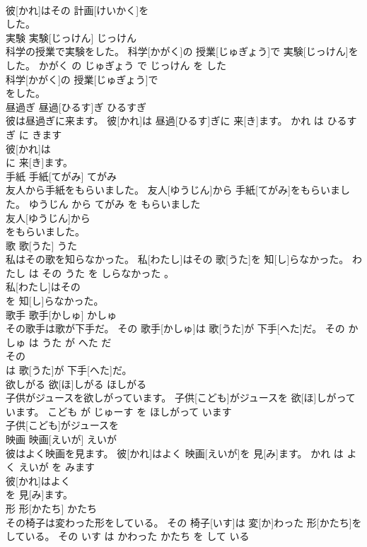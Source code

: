 \documentclass[8pt]{extreport}
\begin{document}
\begin{CJK}{UTF8}{min}
\\	彼[かれ]はその 計画[けいかく]を
\\	した。			
\\	実験	実験[じっけん]	じっけん	
\\	科学の授業で実験をした。	科学[かがく]の 授業[じゅぎょう]で 実験[じっけん]をした。	かがく の じゅぎょう で じっけん を した	
\\	科学[かがく]の 授業[じゅぎょう]で
\\	をした。			
\\	昼過ぎ	昼過[ひるす]ぎ	ひるすぎ	
\\	彼は昼過ぎに来ます。	彼[かれ]は 昼過[ひるす]ぎに 来[き]ます。	かれ は ひるすぎ に きます	
\\	彼[かれ]は
\\	に 来[き]ます。			
\\	手紙	手紙[てがみ]	てがみ	
\\	友人から手紙をもらいました。	友人[ゆうじん]から 手紙[てがみ]をもらいました。	ゆうじん から てがみ を もらいました	
\\	友人[ゆうじん]から
\\	をもらいました。			
\\	歌	歌[うた]	うた	
\\	私はその歌を知らなかった。	私[わたし]はその 歌[うた]を 知[し]らなかった。	わたし は その うた を しらなかった 。	
\\	私[わたし]はその
\\	を 知[し]らなかった。			
\\	歌手	歌手[かしゅ]	かしゅ	
\\	その歌手は歌が下手だ。	その 歌手[かしゅ]は 歌[うた]が 下手[へた]だ。	その かしゅ は うた が へた だ	
\\	その
\\	は 歌[うた]が 下手[へた]だ。			
\\	欲しがる	欲[ほ]しがる	ほしがる	
\\	子供がジュースを欲しがっています。	子供[こども]がジュースを 欲[ほ]しがっています。	こども が じゅーす を ほしがって います	
\\	子供[こども]がジュースを
\\	映画	映画[えいが]	えいが	
\\	彼はよく映画を見ます。	彼[かれ]はよく 映画[えいが]を 見[み]ます。	かれ は よく えいが を みます	
\\	彼[かれ]はよく
\\	を 見[み]ます。			
\\	形	形[かたち]	かたち	
\\	その椅子は変わった形をしている。	その 椅子[いす]は 変[か]わった 形[かたち]をしている。	その いす は かわった かたち を して いる	

\end{CJK}
\end{document}
